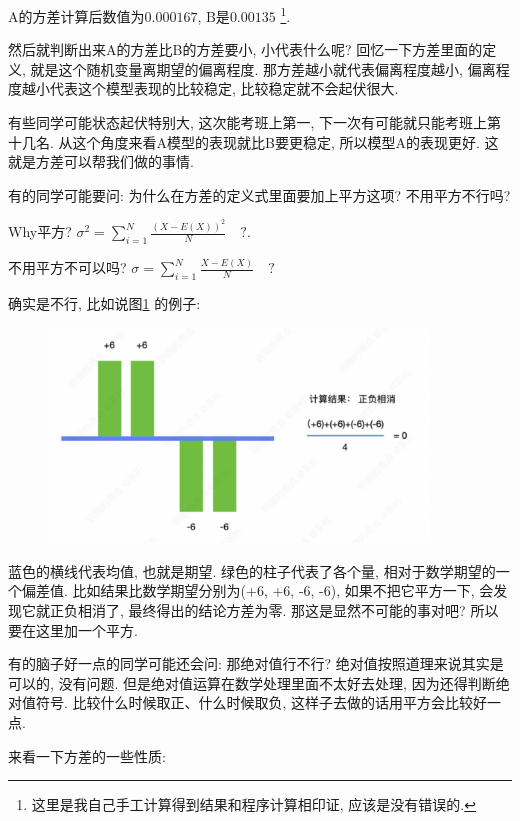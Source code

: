 A的方差计算后数值为$0.000167$, B是$0.00135$ \footnote{这里是我自己手工计算得到结果和程序计算相印证, 应该是没有错误的. }. 

然后就判断出来A的方差比B的方差要小, 小代表什么呢? 回忆一下方差里面的定义, 就是这个随机变量离期望的偏离程度. 那方差越小就代表偏离程度越小, 偏离程度越小代表这个模型表现的比较稳定, 比较稳定就不会起伏很大. 

有些同学可能状态起伏特别大, 这次能考班上第一, 下一次有可能就只能考班上第十几名. 从这个角度来看A模型的表现就比B要更稳定, 所以模型A的表现更好. 这就是方差可以帮我们做的事情. 

有的同学可能要问: 为什么在方差的定义式里面要加上平方这项? 不用平方不行吗? 

Why平方? $\sigma^2 = \sum^N_{i=1}\frac{(X-E(X))^2}{N} \quad ?$.

不用平方不可以吗? $\sigma = \sum^N_{i=1}\frac{X-E(X)}{N} \quad ?$

确实是不行, 比如说图\ref{fig:img5_4} 的例子:

\begin{figure}[ht]
  \centering
  \includegraphics[width=0.9\textwidth]{asset/713e717f-8a86-42db-83e6-b74c5afe50a4.png}
  \caption{}
  \label{fig:img5_4}
\end{figure}

蓝色的横线代表均值, 也就是期望. 绿色的柱子代表了各个量, 相对于数学期望的一个偏差值. 比如结果比数学期望分别为(+6,  +6,  -6,  -6), 如果不把它平方一下, 会发现它就正负相消了, 最终得出的结论方差为零. 那这是显然不可能的事对吧? 所以要在这里加一个平方. 

有的脑子好一点的同学可能还会问: 那绝对值行不行? 绝对值按照道理来说其实是可以的, 没有问题. 但是绝对值运算在数学处理里面不太好去处理, 因为还得判断绝对值符号. 比较什么时候取正、什么时候取负, 这样子去做的话用平方会比较好一点. 

\hypertarget{方差的性质}{}
来看一下方差的一些性质:

